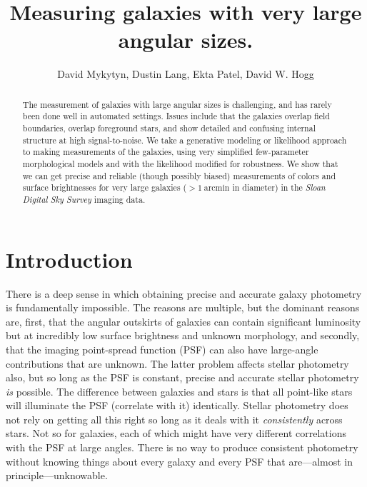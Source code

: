 \documentclass[12pt,preprint,pdftex]{aastex}
\newcounter{address}
\newcommand{\project}[1]{\textsl{#1}}
\newcommand{\units}[1]{\mathrm{#1}}
\renewcommand{\arcmin}{\units{arcmin}}
\begin{document}
\title{
       Measuring galaxies with very large angular sizes.
      }
\author{
        David Mykytyn\altaffilmark{\ref{CCPP}},
        Dustin Lang\altaffilmark{\ref{CMU}},
        Ekta Patel\altaffilmark{\ref{CCPP}},
        David W. Hogg\altaffilmark{\ref{CCPP},\ref{MPIA},\ref{email}}
       }
\setcounter{address}{1}

\begin{abstract}
The measurement of galaxies with large angular sizes is challenging,
and has rarely been done well in automated settings.  Issues include
that the galaxies overlap field boundaries, overlap foreground stars,
and show detailed and confusing internal structure at high
signal-to-noise.  We take a generative modeling or likelihood approach
to making measurements of the galaxies, using very simplified
few-parameter morphological models and with the likelihood modified
for robustness.  We show that we can get precise and reliable (though
possibly biased) measurements of colors and surface brightnesses for
very large galaxies ($>1~\arcmin$ in diameter) in the \project{Sloan
  Digital Sky Survey} imaging data.
\end{abstract}

\section{Introduction}

There is a deep sense in which obtaining precise and accurate galaxy
photometry is fundamentally impossible.  The reasons are multiple, but
the dominant reasons are, first, that the angular outskirts of
galaxies can contain significant luminosity but at incredibly low
surface brightness and unknown morphology, and secondly, that the
imaging point-spread function (PSF) can also have large-angle
contributions that are unknown.  The latter problem affects stellar
photometry also, but so long as the PSF is constant, precise and
accurate stellar photometry \emph{is} possible.  The difference
between galaxies and stars is that all point-like stars will
illuminate the PSF (correlate with it) identically.  Stellar
photometry does not rely on getting all this right so long as it deals
with it \emph{consistently} across stars.  Not so for galaxies, each
of which might have very different correlations with the PSF at large
angles.  There is no way to produce consistent photometry without
knowing things about every galaxy and every PSF that are---almost in
principle---unknowable.
\end{document}
